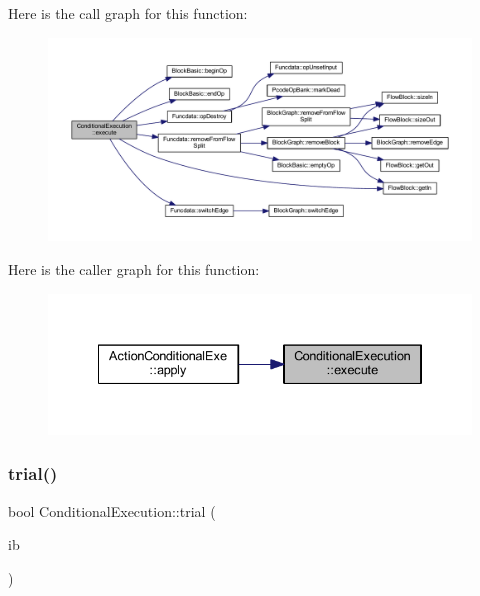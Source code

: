 Here is the call graph for this function\+:
\nopagebreak
\begin{figure}[H]
\begin{center}
\leavevmode
\includegraphics[width=350pt]{class_conditional_execution_afc3956000baa5c9338bdb728ba3034b3_cgraph}
\end{center}
\end{figure}
Here is the caller graph for this function\+:
\nopagebreak
\begin{figure}[H]
\begin{center}
\leavevmode
\includegraphics[width=334pt]{class_conditional_execution_afc3956000baa5c9338bdb728ba3034b3_icgraph}
\end{center}
\end{figure}
\mbox{\label{class_conditional_execution_abf756d499c20aba093c6f3d4214cb4a5}} 
\subsubsection{\texorpdfstring{trial()}{trial()}}
{\footnotesize\ttfamily bool Conditional\+Execution\+::trial (\begin{DoxyParamCaption}\item[{\mbox{\hyperlink{class_block_basic}{Block\+Basic}} $\ast$}]{ib }\end{DoxyParamCaption})}



